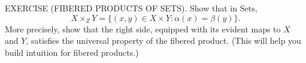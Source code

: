 EXERCISE (FIBERED PRODUCTS OF SETS). Show that in $\mathrm{Sets}$,
$$X\times_ZY=\{(x,y)\in X\times Y:\alpha(x)=\beta(y)\}.$$
More precisely, show that the right side, equipped with its evident maps to $X$ and $Y$, satisfies the universal property of the fibered product. (This will help you build intuition for fibered products.)
